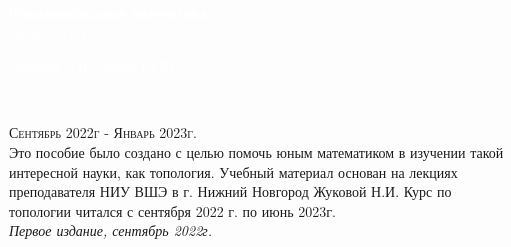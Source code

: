 \documentclass[11pt,fleqn]{book} %
\begin{document}

\begingroup
\thispagestyle{empty}
\centering
\vspace*{6cm}
\par\normalfont\fontsize{32}{32}\sffamily\selectfont
\textcolor{white}{\textbf{Фундаментальная математика}}\\
\textcolor{white}{\LARGE Введение в топологию}\par %
\vspace*{2cm}
\textcolor{white}{\huge Лобанов И.В., Зорин Ю.Ю.}\par %
\endgroup


\newpage
~\vfill
\thispagestyle{empty}

\noindent \textsc{Сентябрь 2022г - Январь 2023г.}\\

\noindent Это пособие было создано с целью помочь юным математиком в изучении такой интересной науки, как топология. Учебный материал основан на лекциях преподавателя НИУ ВШЭ в г. Нижний Новгород Жуковой Н.И. Курс по топологии читался с сентября 2022 г. по июнь 2023г. \\ 

\noindent \textit{Первое издание, сентябрь 2022г. }



\pagestyle{empty} %

\tableofcontents %

\cleardoublepage %

\pagestyle{fancy} %

\end{document}
